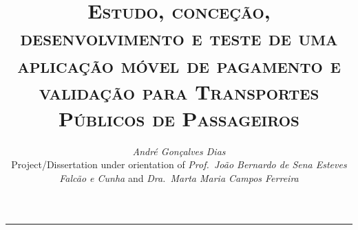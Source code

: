 \documentclass[9pt,a4paper]{extarticle}
\begin{document}
\title{\vspace*{-8mm}\textbf{\textsc{Estudo, conceção, desenvolvimento e teste de uma aplicação móvel de pagamento e validação para Transportes Públicos de Passageiros}}}
\author{\emph{André Gonçalves Dias}\\[2mm]
\small{Project/Dissertation under orientation of \emph{Prof.\ João Bernardo de Sena Esteves Falcão e Cunha} and \emph{Dra.\ Marta Maria Campos Ferreira}}}
\date{}
\maketitle
\thispagestyle{empty}

\vspace*{-4mm}\noindent\rule{\textwidth}{0.4pt}\vspace*{4mm}
\end{document}
